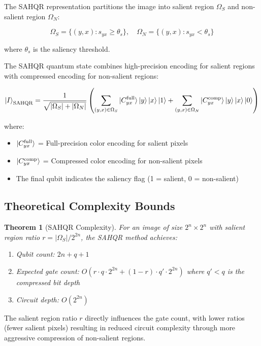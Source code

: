 \documentclass{ipol}
\newtheorem{theorem}{Theorem}
\begin{document}
The SAHQR representation partitions the image into salient region $\Omega_S$ and non-salient region $\Omega_N$:

\begin{equation}
\Omega_S = \{(y, x) : s_{yx} \geq \theta_s\}, \quad \Omega_N = \{(y, x) : s_{yx} < \theta_s\}
\label{eq:partition}
\end{equation}

where $\theta_s$ is the saliency threshold.

The SAHQR quantum state combines high-precision encoding for salient regions with compressed encoding for non-salient regions:

\begin{equation}
\ket{I}_{\text{SAHQR}} = \frac{1}{\sqrt{|\Omega_S| + |\Omega_N|}} \left( \sum_{(y,x) \in \Omega_S} \ket{C_{yx}^{\text{full}}} \ket{y} \ket{x} \ket{1} + \sum_{(y,x) \in \Omega_N} \ket{C_{yx}^{\text{comp}}} \ket{y} \ket{x} \ket{0} \right)
\label{eq:sahqr_state}
\end{equation}

where:
\begin{itemize}
\item $\ket{C_{yx}^{\text{full}}}$ = Full-precision color encoding for salient pixels
\item $\ket{C_{yx}^{\text{comp}}}$ = Compressed color encoding for non-salient pixels
\item The final qubit indicates the saliency flag (1 = salient, 0 = non-salient)
\end{itemize}

\subsection{Theoretical Complexity Bounds}

\begin{theorem}[SAHQR Complexity]
For an image of size $2^n \times 2^n$ with salient region ratio $r = |\Omega_S| / 2^{2n}$, the SAHQR method achieves:
\begin{enumerate}
\item Qubit count: $2n + q + 1$
\item Expected gate count: $O(r \cdot q \cdot 2^{2n} + (1-r) \cdot q' \cdot 2^{2n})$ where $q' < q$ is the compressed bit depth
\item Circuit depth: $O(2^{2n})$
\end{enumerate}
\end{theorem}

The salient region ratio $r$ directly influences the gate count, with lower ratios (fewer salient pixels) resulting in reduced circuit complexity through more aggressive compression of non-salient regions.
\end{document}
